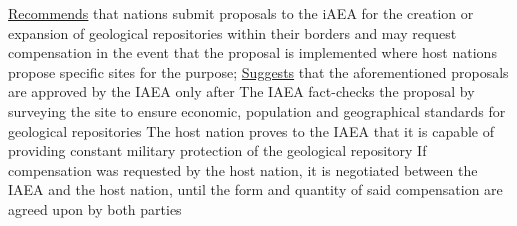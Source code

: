 \documentclass{article}
\begin{document}
\begin{outline}[enumerate]
\1 \underline{Recommends} that nations submit proposals to the iAEA for the creation or expansion of geological repositories within their borders and may request compensation in the event that the proposal is implemented where
\2 host nations propose specific sites for the purpose; 
\1 \underline{Suggests} that the aforementioned proposals are approved by the IAEA only after
\2 The IAEA fact-checks the proposal by surveying the site to ensure economic, population and geographical standards for geological repositories
\2 The host nation proves to the IAEA that it is capable of providing constant military protection of the geological repository
\2 If compensation was requested by the host nation, it is negotiated between the IAEA and the host nation, until the form and quantity of said compensation are agreed upon by both parties

\end{outline}
\end{document}
